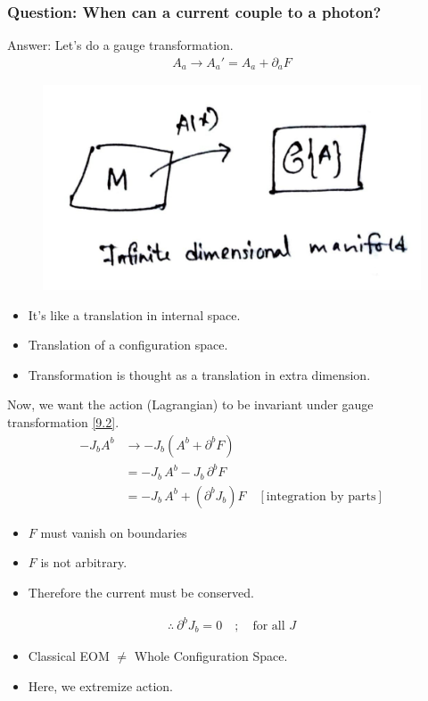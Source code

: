 \documentclass[14pt]{article} %
\begin{document}
\subsubsection*{Question: When can a current couple to a photon?}
Answer: Let's do a gauge transformation.
\begin{align*}
A_a \rightarrow A_a' = A_a + \partial_a F \tag{9.2} \label{9.2}
\end{align*}
\begin{figure}[H]
    \centering
    \includegraphics[width=0.4\linewidth]{figures/C09_2.jpeg}
    \caption*{}
\end{figure}
\vspace{-1cm}
\begin{tcolorbox}[title=Notes]
\begin{itemize}
    \item It's like a translation in internal space.
    \item Translation of a configuration space.
    \item Transformation is thought as a translation in extra dimension.
\end{itemize}
\end{tcolorbox}
Now, we want the action (Lagrangian) to be invariant under gauge transformation \eqref{9.2}.
\begin{align*}
-J_b A^b &\to -J_b (A^b + \partial^b F) \\
&= -J_b \, A^b - J_b \,\partial^b F \\
&= -J_b \, A^b +(\partial^b J_b) F \quad [ \text{integration by parts} ]
\end{align*}
\begin{itemize}
    \item $F$ must vanish on boundaries
    \item $F$ is not arbitrary.
    \item Therefore the current must be conserved.
\end{itemize}
\begin{align*}
\therefore ~\partial^b J_b = 0 \quad; \quad \text{for all } J
\end{align*}
\begin{itemize}
    \item Classical EOM $\neq$ Whole Configuration Space.
    \item Here, we extremize action.
\end{itemize}
\end{document}
